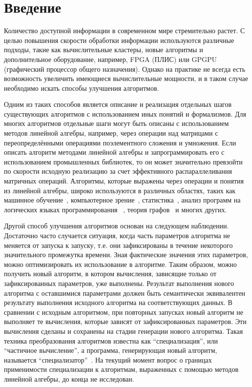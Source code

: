 \section*{Введение}

Количество доступной информации в современном мире стремительно растет.
С целью повышения скорости обработки информации используются различные подходы, такие как вычислительные кластеры, новые алгоритмы и дополнительное оборудование, например, FPGA (ПЛИС) или GPGPU (графический процессор общего назначения). 
Однако на практике не всегда есть возможность увеличить имеющиеся вычислительные мощности, и в таком случае необходимо искать способы улучшения алгоритмов.

Одним из таких способов является описание и реализация отдельных шагов существующих алгоритмов  с использованием иных понятий и формализмов.
Для многих алгоритмов отдельные шаги могут быть описаны с использованием методов линейной алгебры, например, через операции над матрицами с переопределёнными операциями поэлементного сложения и умножения.
Если описать алгоритм методами линейной алгебры и запрограммировать его с использованием промышленных библиотек, то он может значительно превзойти по скорости исходную реализацию за счет эффективного распараллеливания матричных операций.
Алгоритмы, которые выражены через операции и понятия из линейной алгебры, широко используются в различных областях, таких как машинное обучение~\cite{LA_ML}, компьютерное зрение~\cite{LA_CV}, статистика~\cite{LA_STAT}, анализ программ на логических языках программирования ~\cite{part_eval_logic}, теория графов~\cite{SuiteSparse} и многих других.

Другой способ улучшения алгоритмов основан на следующем наблюдении. 
Достаточно часто случается ситуация, когда часть параметров алгоритма не меняется от запуска к запуску, т.е. они зафиксированы в течение некоторого значительного промежутка времени.
Зная фактические значения этих параметров, можно оптимизировать их использование в алгоритме. 
Таким образом, можно получить новый алгоритм, в котором вычисления, зависящие только от зафиксированных параметров, уже выполнены.
Результат выполнения нового алгоритма с оставшимися параметрами должен быть семантически эквивалентен результату выполнения исходного алгоритма на соответствующих данных. 
В сравнении с исходным алгоритмом, при повторных запусках новый алгоритм не выполняет те вычисления, которые зависят от зафиксированных параметров. 
Эти вычисления сделаны и сохранены на стадии генерации нового алгоритма.
Такая техника преобразования алгоритмов известна как “специализация”, или “частичное вычисление”, а программа, генерирующая новый алгоритм, называется “специализатор”~\cite{Jones_spec}.
На текущий момент вопрос о границах применимости специализации к алгоритмам, выраженных с помощью методов линейной алгебры, до конца не исследован.

